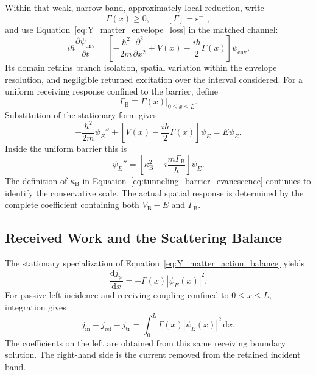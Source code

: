 Within that weak, narrow-band, approximately local reduction, write
\begin{equation}
    \Gamma(x)\geq0,
    \qquad [\Gamma]=\mathrm s^{-1},
    \label{eq:tunneling_quantum_damping_rate}
\end{equation}
and use Equation~\eqref{eq:Y_matter_envelope_loss} in the matched channel:
\begin{equation}
    i\hbar\frac{\partial\psi_{\mathrm{env}}}{\partial t}
    =\left[
        -\frac{\hbar^2}{2m}\frac{\partial^2}{\partial x^2}
        +V(x)-\frac{i\hbar}{2}\Gamma(x)
    \right]\psi_{\mathrm{env}}.
\end{equation}
Its domain retains branch isolation, spatial variation within the envelope resolution, and negligible returned excitation over the interval considered. For a uniform receiving response confined to the barrier, define
\begin{equation}
    \Gamma_{\mathrm B}
    \equiv\Gamma(x)\big|_{0\leq x\leq L}.
    \label{eq:tunneling_barrier_damping}
\end{equation}
Substitution of the stationary form gives
\begin{equation}
    -\frac{\hbar^2}{2m}\psi_E''
    +\left[V(x)-\frac{i\hbar}{2}\Gamma(x)\right]\psi_E
    =E\psi_E.
\end{equation}
Inside the uniform barrier this is
\begin{equation}
    \boxed{
    \psi_E''
    =\left[\kappa_{\mathrm B}^2
    -i\frac{m\Gamma_{\mathrm B}}{\hbar}\right]\psi_E
    }.
\end{equation}
The definition of $\kappa_{\mathrm B}$ in Equation~\eqref{eq:tunneling_barrier_evanescence} continues to identify the conservative scale. The actual spatial response is determined by the complete coefficient containing both $V_{\mathrm B}-E$ and $\Gamma_{\mathrm B}$.

\subsection{Received Work and the Scattering Balance}

The stationary specialization of Equation~\eqref{eq:Y_matter_action_balance} yields
\begin{equation}
    \boxed{
    \frac{\mathrm dj_\psi}{\mathrm dx}
    =-\Gamma(x)|\psi_E(x)|^2
    }.
\end{equation}
For passive left incidence and receiving coupling confined to $0\leq x\leq L$, integration gives
\begin{equation}
    \boxed{
    j_{\mathrm{in}}-j_{\mathrm{ref}}-j_{\mathrm{tr}}
    =\int_0^L\Gamma(x)|\psi_E(x)|^2\,\mathrm dx
    }.
\end{equation}
The coefficients on the left are obtained from this same receiving boundary solution. The right-hand side is the current removed from the retained incident band.

